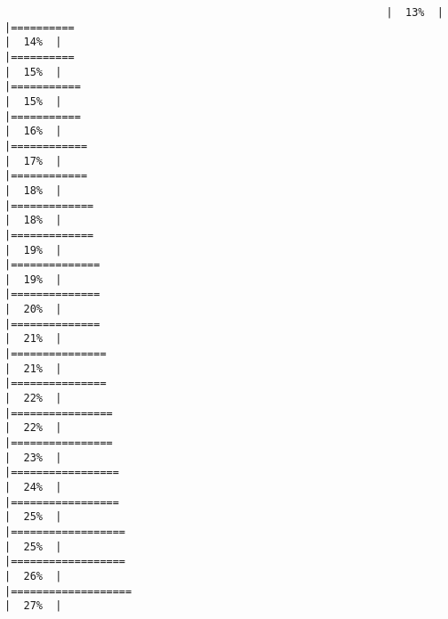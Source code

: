 \documentclass[
]{book}
\begin{document}
\begin{verbatim}
                                                            |  13%  |                                                                              |==========                                                            |  14%  |                                                                              |==========                                                            |  15%  |                                                                              |===========                                                           |  15%  |                                                                              |===========                                                           |  16%  |                                                                              |============                                                          |  17%  |                                                                              |============                                                          |  18%  |                                                                              |=============                                                         |  18%  |                                                                              |=============                                                         |  19%  |                                                                              |==============                                                        |  19%  |                                                                              |==============                                                        |  20%  |                                                                              |==============                                                        |  21%  |                                                                              |===============                                                       |  21%  |                                                                              |===============                                                       |  22%  |                                                                              |================                                                      |  22%  |                                                                              |================                                                      |  23%  |                                                                              |=================                                                     |  24%  |                                                                              |=================                                                     |  25%  |                                                                              |==================                                                    |  25%  |                                                                              |==================                                                    |  26%  |                                                                              |===================                                                   |  27%  |                                                                              
\end{verbatim}
\end{document}
